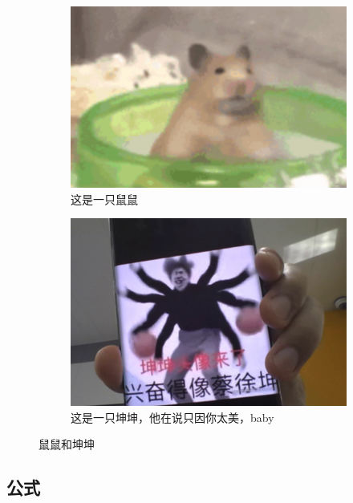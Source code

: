 \begin{figure}[htb]
    \centering
    \begin{subfigure}[t]{.35\textwidth}
        \centering
        \includegraphics[width=1\textwidth]{figures/shushu.png}
        \caption{这是一只鼠鼠}\label{fig.shushu}
    \end{subfigure}
    \begin{subfigure}[t]{.35\textwidth}
        \centering
        \includegraphics[width=1\textwidth]{figures/kunkun.png}
        \caption{这是一只坤坤，他在说只因你太美，baby}\label{fig.kunkun}
    \end{subfigure}

    \caption{鼠鼠和坤坤}\label{fig.shu_and_kun}
\end{figure}

\subsection{公式}


